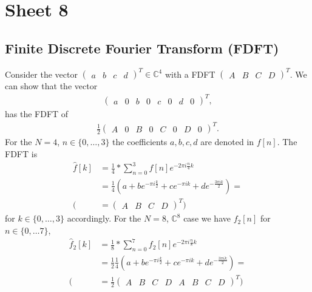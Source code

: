


\maketitle
\tableofcontents

\section{Sheet 8}
\subsection{Finite Discrete Fourier Transform (FDFT)}
Consider the vector $\begin{pmatrix}a & b & c & d\end{pmatrix}^T \in
\mathbb{C}^4$ with a FDFT $\begin{pmatrix}A & B & C & D\end{pmatrix}^T$. We
can show that the vector
\begin{align}
    \begin{pmatrix}a & 0 & b & 0 & c & 0 & d & 0\end{pmatrix}^T,
\end{align}
has the FDFT of
\begin{align}
    \frac{1}{2}\begin{pmatrix}A & 0 & B & 0 & C & 0 & D & 0\end{pmatrix}^T.
\end{align}
For the $N=4$, $n\in\{0,\dots,3\}$ the coefficients $a, b, c, d$ are denoted in
$f[n]$. The FDFT is
\begin{align}
    \hat{f}[k] &= \frac{1}{4} * \sum_{n=0}^3 f[n] e^{-2\pi i \frac{n}{4}k} \\
               &=\frac{1}{4}\left(
                   a + be^{-\pi i \frac{k}{2}}
                   + ce^{-\pi i k}+ de^{-\frac{3\pi i k}{2}}
               \right) = \\
    (&=\begin{pmatrix}A & B & C & D\end{pmatrix}^T)
\end{align}
for $k \in \{0,\dots, 3\}$ accordingly. For the $N=8$, $\mathbb{C}^8$ case
 we have $f_2[n]$ for $n \in \{0,\dots 7\}$,
 \begin{align}
    \hat{f}_2[k] &= \frac{1}{8} * \sum_{n=0}^7 f_2[n] e^{-2\pi i \frac{n}{8}k} \\
               &=\frac{1}{2}\frac{1}{4}\left(
                   a + be^{-\pi i \frac{k}{2}}
                   + ce^{-\pi i k}+ de^{-\frac{3\pi i k}{2}}
               \right) = \\
    (&=\frac{1}{2}\begin{pmatrix}A & B & C & D & A & B & C & D\end{pmatrix}^T)
 \end{align}
